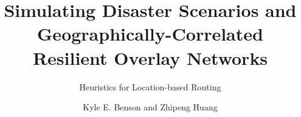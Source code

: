 \documentclass[pdftex]{beamer}
\begin{document}
\title[Short Title]{Simulating Disaster Scenarios and Geographically-Correlated Resilient Overlay Networks}
\subtitle{Heuristics for Location-based Routing}
\author[K. Benson and Z. Huang]{Kyle E. Benson and Zhipeng Huang}


\begin{frame}[plain]
	\titlepage
\end{frame}

\end{document}
